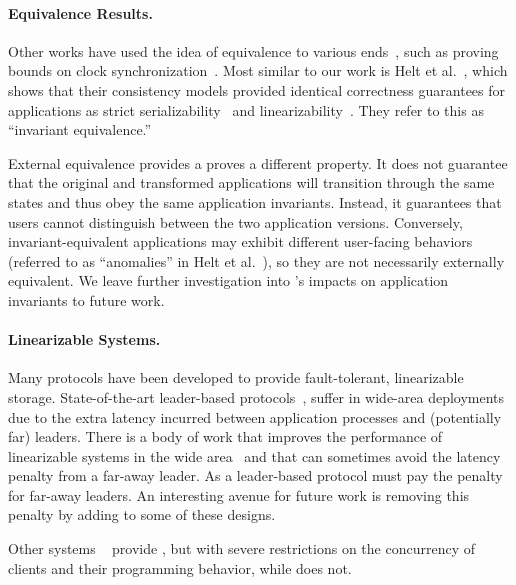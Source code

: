 \paragraph{Equivalence Results.}
Other works have used the idea of equivalence to various
ends~\cite{goldman1993unifiedModel,lundelius1984clocksync,
fischer1985flp,attiya1993seqlin},
such as proving bounds on clock
synchronization~\cite{lundelius1984clocksync}.
Most similar to our work is Helt et al.~\cite{helt2021rss}, which shows that their consistency
models provided identical correctness guarantees for applications
as strict serializability~\cite{papadimitriou1979serializability} and linearizability~\cite{herlihy1990linearizability}.
They refer to this as ``invariant equivalence.'' 

External equivalence provides a proves a different property.
It does not guarantee that the original and transformed applications
will transition through the same states and thus obey the same
application invariants. Instead, it guarantees that users cannot distinguish between the two
application versions.
Conversely, invariant-equivalent applications may exhibit different
user-facing behaviors (referred to as ``anomalies'' in Helt et
al.~\cite{helt2021rss}), so they are not necessarily externally equivalent.
We leave further investigation into
\MDL{}'s impacts on application invariants to future work.

\paragraph{Linearizable Systems.} Many protocols have been developed to provide fault-tolerant, linearizable storage.
State-of-the-art leader-based
protocols~\cite{ongaro2014raft,lamport1998paxos,oki1988vr},
suffer in wide-area deployments due to the extra
latency incurred between application processes and (potentially far)
leaders.
There is a body of work that improves the performance of
linearizable systems in the wide
area~\cite{mao2008mencius,moraru2013epaxos,burke2020gryff} and that can sometimes avoid the latency penalty from a far-away leader.
As a leader-based protocol \sys{} must pay the penalty for far-away leaders.
An interesting avenue for future work is removing this penalty by adding \mdl{} to some of these designs.

Other systems ~\cite{salus} provide \mdl{}, but with severe restrictions on the concurrency of clients and their programming behavior, while \system{} does not.

